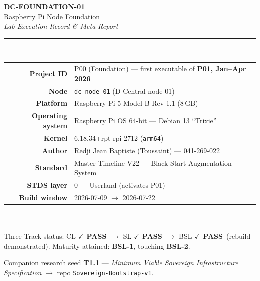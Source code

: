 \documentclass[11pt,a4paper]{article}
\newcommand{\pass}{\textcolor{okgreen}{\textbf{$\checkmark$ PASS}}}
\newcommand{\bsl}[1]{\textcolor{dcred}{\textbf{BSL-#1}}}
\begin{document}
\begin{titlepage}
\centering
\vspace*{1.2cm}
{\LARGE\bfseries\color{dcred} DC-FOUNDATION-01}\\[6pt]
{\Large Raspberry Pi Node Foundation}\\[4pt]
{\large\itshape Lab Execution Record \& Meta Report}\\[18pt]
\rule{0.7\linewidth}{0.8pt}\\[14pt]

\begin{tabular}{rl}
\textbf{Project ID}      & P00 (Foundation) — first executable of \textbf{P01, Jan–Apr 2026}\\
\textbf{Node}            & \texttt{dc-node-01} \quad(D-Central node 01)\\
\textbf{Platform}        & Raspberry Pi 5 Model B Rev 1.1 (8\,GB)\\
\textbf{Operating system}& Raspberry Pi OS 64-bit — Debian 13 ``Trixie''\\
\textbf{Kernel}          & 6.18.34+rpt-rpi-2712 (\texttt{arm64})\\
\textbf{Author}          & Redji Jean Baptiste (Toussaint) — 041-269-022\\
\textbf{Standard}        & Master Timeline V22 — Black Start Augmentation System\\
\textbf{STDS layer}      & 0 — Userland (activates P01)\\
\textbf{Build window}    & 2026-07-09 $\rightarrow$ 2026-07-22\\
\end{tabular}\\[20pt]

\\[16pt]

{\small\color{dcgray} Three-Track status: CL \pass\ $\rightarrow$ SL \pass\ $\rightarrow$ BSL \pass\ (rebuild demonstrated).
Maturity attained: \bsl{1}, touching \bsl{2}.}

\vfill
{\small\color{dcgray} Companion research seed \textbf{T1.1} — \emph{Minimum Viable Sovereign
Infrastructure Specification} $\rightarrow$ repo \texttt{Sovereign-Bootstrap-v1}.}
\end{titlepage}
\end{document}
